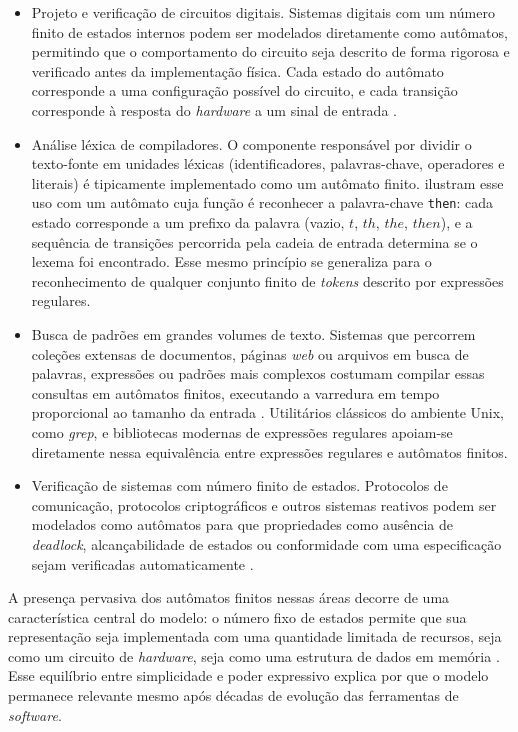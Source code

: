 \documentclass[
    12pt
    ,oneside
    ,a4paper
    ,chapter=TITLE
    ,section=TITLE
    ,sumario=abnt-6027-2012]{abntex2}
\begin{document}
\begin{itemize}
    \item Projeto e verificação de circuitos digitais. Sistemas digitais com um número
    finito de estados internos podem ser modelados diretamente como autômatos, permitindo que
    o comportamento do circuito seja descrito de forma rigorosa e verificado antes da
    implementação física. Cada estado do autômato corresponde a uma configuração possível do
    circuito, e cada transição corresponde à resposta do \textit{hardware} a um sinal de entrada
    \cite{hopcroft2006}.

    \item Análise léxica de compiladores. O componente responsável por dividir o
    texto-fonte em unidades léxicas (identificadores, palavras-chave, operadores e literais)
    é tipicamente implementado como um autômato finito.  ilustram
    esse uso com um autômato cuja função é reconhecer a palavra-chave \texttt{then}: cada
    estado corresponde a um prefixo da palavra (vazio, $t$, $th$, $the$, $then$), e a
    sequência de transições percorrida pela cadeia de entrada determina se o lexema foi
    encontrado. Esse mesmo princípio se generaliza para o reconhecimento de qualquer conjunto
    finito de \textit{tokens} descrito por expressões regulares.

    \item Busca de padrões em grandes volumes de texto. Sistemas que percorrem
    coleções extensas de documentos, páginas \textit{web} ou arquivos em busca de palavras,
    expressões ou padrões mais complexos costumam compilar essas consultas em autômatos
    finitos, executando a varredura em tempo proporcional ao tamanho da entrada
    \cite{hopcroft2006}. Utilitários clássicos do ambiente Unix, como \textit{grep}, e
    bibliotecas modernas de expressões regulares apoiam-se diretamente nessa equivalência
    entre expressões regulares e autômatos finitos.

    \item Verificação de sistemas com número finito de estados. Protocolos de
    comunicação, protocolos criptográficos e outros sistemas reativos podem ser modelados
    como autômatos para que propriedades como ausência de \textit{deadlock}, alcançabilidade
    de estados ou conformidade com uma especificação sejam verificadas automaticamente
    \cite{hopcroft2006}.
\end{itemize}

A presença pervasiva dos autômatos finitos nessas áreas decorre de uma característica central
do modelo: o número fixo de estados permite que sua representação seja implementada com uma
quantidade limitada de recursos, seja como um circuito de \textit{hardware}, seja como uma estrutura
de dados em memória \cite{hopcroft2006}. Esse equilíbrio entre simplicidade e poder expressivo
explica por que o modelo permanece relevante mesmo após décadas de evolução das ferramentas
de \textit{software}.
\end{document}
